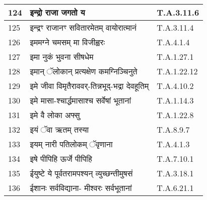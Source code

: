 \documentclass[17pt]{extarticle}
\begin{document}
\begin{longtable}{||p{0.4in}||p{4.9in}||p{0.9in}||}
    \hline
        
    124 & इन्द्रो राजा जगतो य & T.A.3.11.6       \\
    
    \hline
        
    125 & इन्द्रꣳ राजानꣳ सवितारमेतम् वायोरात्मानं & T.A.3.11.4       \\
    
    \hline
        
    126 & इममग्ने चमसम् मा विजीह्वरः & T.A.4.1.4       \\
    
    \hline
        
    127 & इमा नुकं भुवना सीषधेम & T.A.1.27.1       \\
    
    \hline
        
    128 & इमान् ॅलोकान् प्रत्यक्षेण कमग्निञ्चिनुते & T.A.1.22.12       \\
    
    \hline
        
    129 & इमे जीवा विमृतैराववर्{-}तिन्नभूद्{-}भद्रा देवहूतिम् & T.A.4.10.2       \\
    
    \hline
        
    130 & इमे मासा{-}श्चार्द्धमासाश्च सर्वेषां भूतानां & T.A.1.14.3       \\
    
    \hline
        
    131 & इमे वै लोका अफ्सु & T.A.1.22.8       \\
    
    \hline
        
    132 & इयं ॅवा ऋतम् तस्या & T.A.8.9.7       \\
    
    \hline
        
    133 & इयम् नारी पतिलोकम् ॅवृणाना & T.A.4.1.3       \\
    
    \hline
        
    134 & इषे पीपिहि ऊर्जे पीपिहि & T.A.7.10.1       \\
    
    \hline
        
    135 & ईयुष्टे ये पूर्वतरामपश्यन् व्युच्छन्तीमुषसं & T.A.3.18.1       \\
    
    \hline
        
    136 & ईशानः सर्वविद्याना{-} मीश्वरः सर्वभूतानां & T.A.6.21.1       \\
    

\end{longtable}
\end{document}
